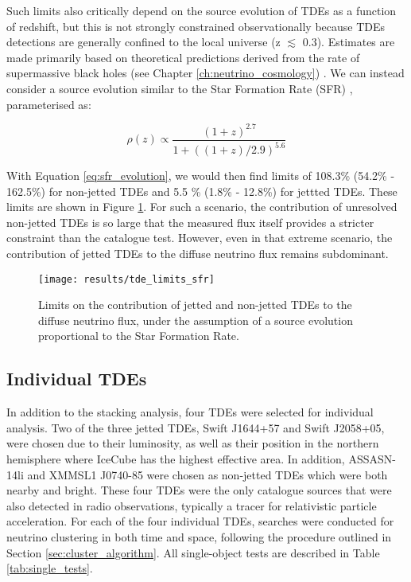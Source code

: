 Such limits also critically depend on the source evolution of TDEs as a function of redshift, but this is not strongly constrained observationally because TDEs detections are generally confined to the local universe (z $\lesssim$ 0.3). Estimates are made primarily based on theoretical predictions derived from the rate of supermassive black holes (see Chapter \ref{ch:neutrino_cosmology}) \cite{Sun:2015bda}. We can instead consider a source evolution similar to the Star Formation Rate (SFR) , parameterised as:

\begin{equation}
\rho(z) \propto\frac{(1+z)^{2.7}}{1 + ((1+z)/2.9)^{5.6}}
\label{eq:sfr_evolution}
\end{equation}

With Equation \ref{eq:sfr_evolution}, we would then find limits of 108.3\% (54.2\% - 162.5\%) for non-jetted TDEs and 5.5 \% (1.8\% - 12.8\%) for jettted TDEs. These limits are shown in Figure \ref{fig:DiffuseFluxSFR}. For such a scenario, the contribution of unresolved non-jetted TDEs is so large that the measured flux itself provides a stricter constraint than the catalogue test. However, even in that extreme scenario, the contribution of jetted TDEs to the diffuse neutrino flux remains subdominant.

\begin{figure}[!ht]
	\centering \texttt{[image: results/tde\_limits\_sfr]}
	\caption{Limits on the contribution of jetted and non-jetted TDEs to the diffuse neutrino flux, under the assumption of a source evolution proportional to the Star Formation Rate.}
	\label{fig:DiffuseFluxSFR}
\end{figure}

\subsection*{Individual TDEs}

In addition to the stacking analysis, four TDEs were selected for individual analysis. Two of the three jetted TDEs, Swift J1644+57 and Swift J2058+05, were chosen due to their luminosity, as well as their position in the northern hemisphere where IceCube has the highest effective area. In addition, ASSASN-14li and  XMMSL1 J0740-85 were chosen as non-jetted TDEs which were both nearby and bright. These four TDEs were the only catalogue sources that were also detected in radio observations, typically a tracer for relativistic particle acceleration. For each of the four individual TDEs, searches were conducted for neutrino clustering in both time and space, following the procedure outlined in Section \ref{sec:cluster_algorithm}. All single-object tests are described in Table \ref{tab:single_tests}.

